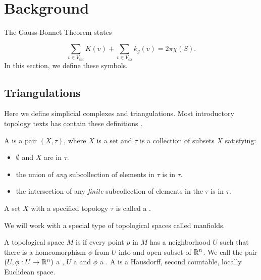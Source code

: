 \section{Background}\label{sec:background}
\label{sec:cast}
The Gauss-Bonnet Theorem states

\begin{equation} \label{eqn:g-b}
\sum_{v\in V_{int}} K(v) + \sum_{v\in V_{\partial S}} k_g(v) = 2\pi \chi(S).
\end{equation}
In this section, we define these symbols.







\subsection{Triangulations}

Here we define simplicial complexes and triangulations.
Most introductory topology texts has contain these definitions \cite{munkres,jm08}.

\begin{definition}
A  is a pair $(X,\tau)$, where $X$ is a set and
 $\tau$ is a collection of subsets $X$
satisfying:
	\begin{itemize}
		\item $\emptyset$ and $X$ are in $\tau.$
		\item the union of \emph{any} subcollection of elements in $\tau$ is  in $\tau.$
		\item the intersection of any \emph{finite} subcollection of elements in the $\tau$ is in $\tau.$
	\end{itemize}
A set $X$ with a specified topology $\tau$ is called a .
\end{definition}

We will work with a special type of topological spaces called manfiolds.

\begin{definition}
	A topological space $M$ is 
	if every point $p$ in $M$ has a neighborhood $U$ such that there is  a
	homeomorphism  $\phi$ from $U$ into and open  subset of $\mathbb{R}^n$.
	We call the pair $(U,\phi: U\to \mathbb{R}^n)$ a , $U$ a 
	and  $\phi$ a . 
A  is a Hausdorff, second countable, locally Euclidean space.
\end{definition}


